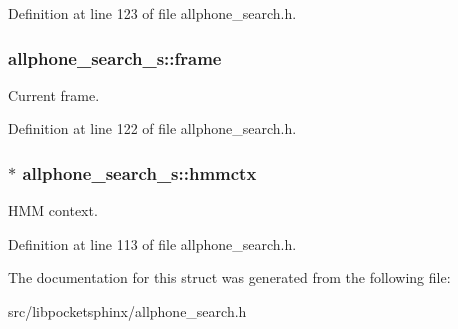 Definition at line 123 of file allphone\+\_\+search.\+h.

\subsubsection[{frame}]{ allphone\+\_\+search\+\_\+s\+::frame}\label{structallphone__search__s_a458aad951cc506c072d67d8d9f163fd7}


Current frame. 



Definition at line 122 of file allphone\+\_\+search.\+h.

\subsubsection[{hmmctx}]{$\ast$ allphone\+\_\+search\+\_\+s\+::hmmctx}\label{structallphone__search__s_aa82fce72da16af69af92aeca29beed3d}


H\+M\+M context. 



Definition at line 113 of file allphone\+\_\+search.\+h.



The documentation for this struct was generated from the following file\+:\begin{DoxyCompactItemize}
\item 
src/libpocketsphinx/allphone\+\_\+search.\+h\end{DoxyCompactItemize}

